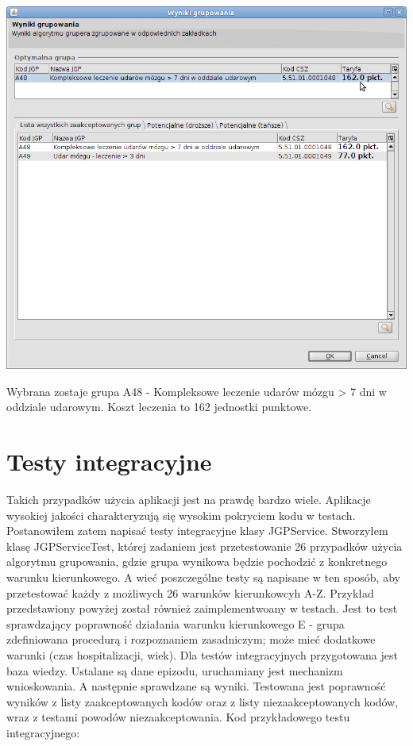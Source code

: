 \includegraphics[scale=0.4]{images/gruper15}

Wybrana zostaje grupa A48 - Kompleksowe leczenie udarów mózgu > 7 dni w oddziale udarowym. Koszt leczenia to 162 jednostki punktowe.


\section{Testy integracyjne}
\label{sec:testyIntegracyjne}

Takich przypadków użycia aplikacji jest na prawdę bardzo wiele. Aplikacje wysokiej jakości charakteryzują się wysokim pokryciem kodu w testach. Postanowiłem zatem napisać testy integracyjne klasy JGPService. Stworzyłem klasę JGPServiceTest, której zadaniem jest przetestowanie 26 przypadków użycia algorytmu grupowania, gdzie grupa wynikowa będzie pochodzić z konkretnego warunku kierunkowego. A wieć poszczególne testy są napisane w ten sposób, aby przetestować każdy z możliwych 26 warunków kierunkowcyh A-Z.
Przykład przedstawiony powyżej został również zaimplementwoany w testach. Jest to test sprawdzający poprawność działania warunku kierunkowego E - grupa zdefiniowana procedurą i rozpoznaniem zasadniczym; może mieć dodatkowe warunki (czas hospitalizacji, wiek).
Dla testów integracyjnych przygotowana jest baza wiedzy. Ustalane są dane epizodu, uruchamiany jest mechanizm wnioskowania. A następnie sprawdzane są wyniki. Testowana jest poprawność wyników z listy zaakceptowanych kodów oraz z listy niezaakceptowanych kodów, wraz z testami powodów niezaakceptowania.
Kod przykładowego testu integracyjnego:

